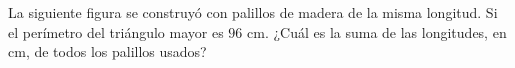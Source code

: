 La siguiente figura se construyó con palillos de madera de la misma longitud. Si el perímetro del triángulo mayor es $96$ cm. ¿Cuál es la suma de las longitudes, en cm, de todos los palillos usados?